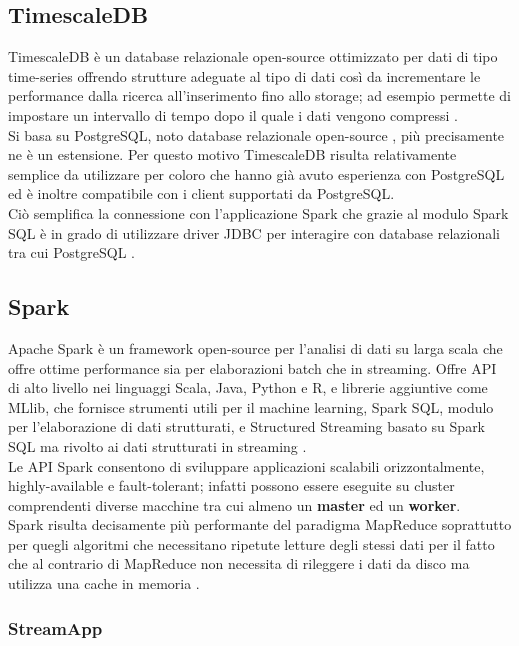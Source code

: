 \subsection{TimescaleDB}

TimescaleDB è un database relazionale open-source ottimizzato per dati di tipo time-series
offrendo strutture adeguate al tipo di dati così da incrementare le performance dalla ricerca
all'inserimento fino allo storage; ad esempio permette di impostare un intervallo di tempo
dopo il quale i dati vengono compressi \cite{timescale}.
\\
Si basa su PostgreSQL, noto database relazionale open-source \cite{postgresql}, più precisamente
ne è un estensione. Per questo motivo TimescaleDB risulta relativamente semplice da utilizzare
per coloro che hanno già avuto esperienza con PostgreSQL ed è inoltre compatibile con i client
supportati da PostgreSQL.
\\
Ciò semplifica la connessione con l'applicazione Spark che grazie al modulo Spark SQL è in grado
di utilizzare driver JDBC per interagire con database relazionali tra cui PostgreSQL
\cite{spark_sql}.

\subsection{Spark}

Apache Spark è un framework open-source per l'analisi di dati su larga scala che offre ottime
performance sia per elaborazioni batch che in streaming. Offre API di alto livello nei linguaggi
Scala, Java, Python e R, e librerie aggiuntive come MLlib, che fornisce strumenti utili per il
machine learning, Spark SQL, modulo per l'elaborazione di dati strutturati,
e Structured Streaming basato su Spark SQL ma rivolto ai dati strutturati in streaming \cite{spark}.
\\
Le API Spark consentono di sviluppare applicazioni scalabili orizzontalmente, highly-available
e fault-tolerant; infatti possono
essere eseguite su cluster comprendenti diverse macchine tra cui almeno un \textbf{master} ed un
\textbf{worker}.
\\
Spark risulta decisamente più performante del paradigma MapReduce soprattutto per quegli algoritmi
che necessitano ripetute letture degli stessi dati per il fatto che al contrario di MapReduce non
necessita di rileggere i dati da disco ma utilizza una cache in memoria \cite{spark_mapred}.

\subsubsection{StreamApp}

